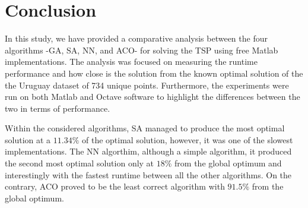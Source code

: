 \documentclass[twocolumn]{article}
\begin{document}
	\begin{table}[h!]
		\caption{Results of TSP algorithms}
	\label{tab:results}
	\end{table}

	
	\section{Conclusion}
	In this study, we have provided a comparative analysis between the four algorithms -GA, SA, NN, and ACO- for solving the TSP using free {Matlab\texttrademark} implementations. The analysis was focused on measuring the runtime performance and how close is the solution from the known optimal solution of the the Uruguay dataset of 734 unique points. Furthermore, the experiments were run on both {Matlab\texttrademark} and {Octave\texttrademark} software to highlight the differences between the two in terms of performance.
	
	Within the considered algorithms, SA managed to produce the most optimal solution at a $11.34\%$ of the optimal solution, however, it was one of the slowest implementations. The NN algorthim, although a simple algorithm, it produced the second most optimal solution only at $18\%$ from the global optimum and interestingly with the fastest runtime between all the other algorithms. On the contrary, ACO proved to be the least correct algorithm with $91.5\%$ from the global optimum.
	
\end{document}
